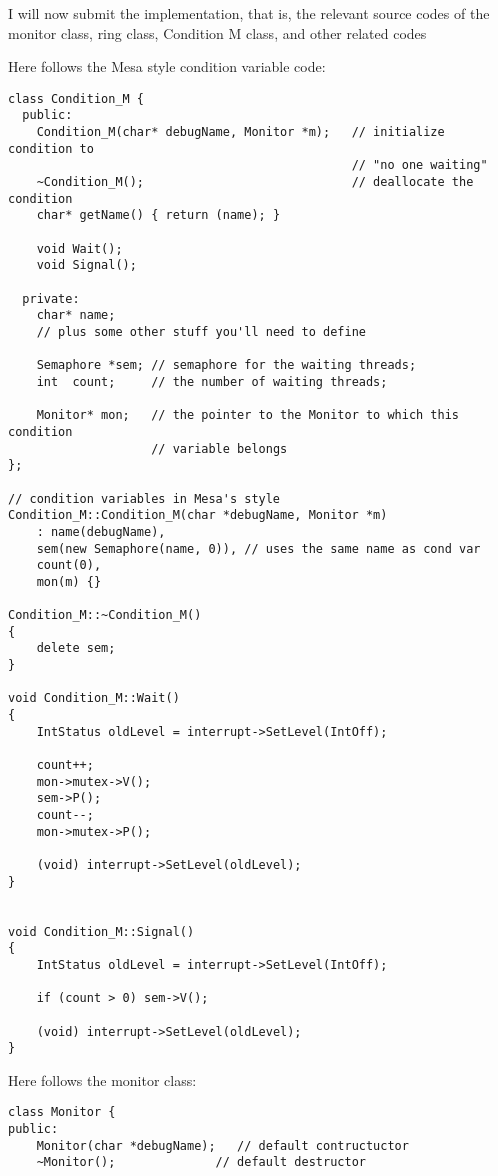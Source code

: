 \documentclass[11pt]{article}
\begin{document}
\begin{question}

    I will now submit the implementation, that is, the relevant source codes of the monitor class, ring class, Condition M class, and other related codes

    Here follows the Mesa style condition variable code:

    \begin{verbatim}
class Condition_M {
  public:
    Condition_M(char* debugName, Monitor *m);   // initialize condition to
                                                // "no one waiting"
    ~Condition_M();                             // deallocate the condition
    char* getName() { return (name); }

    void Wait();
    void Signal();

  private:
    char* name;
    // plus some other stuff you'll need to define

    Semaphore *sem; // semaphore for the waiting threads;
    int  count;     // the number of waiting threads;

    Monitor* mon;   // the pointer to the Monitor to which this condition
                    // variable belongs
};

// condition variables in Mesa's style
Condition_M::Condition_M(char *debugName, Monitor *m)
    : name(debugName),
    sem(new Semaphore(name, 0)), // uses the same name as cond var
    count(0),
    mon(m) {}

Condition_M::~Condition_M()
{
    delete sem;
}

void Condition_M::Wait()
{
    IntStatus oldLevel = interrupt->SetLevel(IntOff);

    count++;
    mon->mutex->V();
    sem->P();
    count--;
    mon->mutex->P();

    (void) interrupt->SetLevel(oldLevel);
}


void Condition_M::Signal()
{
    IntStatus oldLevel = interrupt->SetLevel(IntOff);

    if (count > 0) sem->V();

    (void) interrupt->SetLevel(oldLevel);
}
    \end{verbatim}

    Here follows the monitor class:

    \begin{verbatim}
class Monitor {
public:
    Monitor(char *debugName);   // default contructuctor
    ~Monitor();              // default destructor


\end{verbatim}
\end{question}
\end{document}
